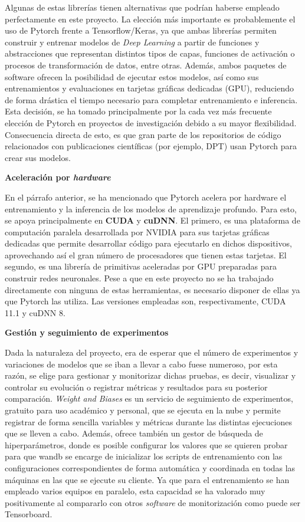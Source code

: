 Algunas de estas librerías tienen alternativas que podrían haberse empleado perfectamente en este proyecto. La elección más importante es probablemente el uso de Pytorch frente a Tensorflow/Keras, ya que ambas librerías permiten construir y entrenar modelos de \textit{Deep Learning} a partir de funciones y abstracciones que representan distintos tipos de capas, funciones de activación o procesos de transformación de datos, entre otras. Además, ambos paquetes de software ofrecen la posibilidad de ejecutar estos modelos, así como sus entrenamientos y evaluaciones en tarjetas gráficas dedicadas (GPU), reduciendo de forma drástica el tiempo necesario para completar entrenamiento e inferencia. Esta decisión, se ha tomado principalmente por la cada vez más frecuente elección de Pytorch en proyectos de investigación debido a su mayor flexibilidad. Consecuencia directa de esto, es que gran parte de los repositorios de código relacionados con publicaciones científicas (por ejemplo, DPT) usan Pytorch para crear sus modelos.

\textbf{Aceleración por \textit{hardware}}

En el párrafo anterior, se ha mencionado que Pytorch acelera por hardware el entrenamiento y la inferencia de los modelos de aprendizaje profundo. Para esto, se apoya principalmente en \textbf{CUDA} y \textbf{cuDNN}. El primero, es una plataforma de computación paralela desarrollada por NVIDIA para sus tarjetas gráficas dedicadas que permite desarrollar código para ejecutarlo en dichos dispositivos, aprovechando así el gran número de procesadores que tienen estas tarjetas. El segundo, es una librería de primitivas aceleradas por GPU preparadas para construir redes neuronales. Pese a que en este proyecto no se ha trabajado directamente con ninguna de estas herramientas, es necesario disponer de ellas ya que Pytorch las utiliza. Las versiones empleadas son, respectivamente, CUDA 11.1 y cuDNN 8.

\textbf{Gestión y seguimiento de experimentos}

Dada la naturaleza del proyecto, era de esperar que el número de experimentos y variaciones de modelos que se iban a llevar a cabo fuese numeroso, por esta razón, se elige  para gestionar y monitorizar dichas pruebas, es decir, visualizar y controlar su evolución o registrar métricas y resultados para su posterior comparación. \textit{Weight and Biases} es un servicio de seguimiento de experimentos, gratuito para uso académico y personal, que se ejecuta en la nube y permite registrar de forma sencilla variables y métricas durante las distintas ejecuciones que se lleven a cabo. Además, ofrece también un gestor de búsqueda de hiperparámetros, donde es posible configurar los valores que se quieren probar para que wandb se encarge de inicializar los scripts de entrenamiento con las configuraciones correspondientes de forma automática y coordinada en todas las máquinas en las que se ejecute su cliente. Ya que para el entrenamiento se han empleado varios equipos en paralelo, esta capacidad se ha valorado muy positivamente al compararlo con otros \textit{software} de monitorización como puede ser Tensorboard.

